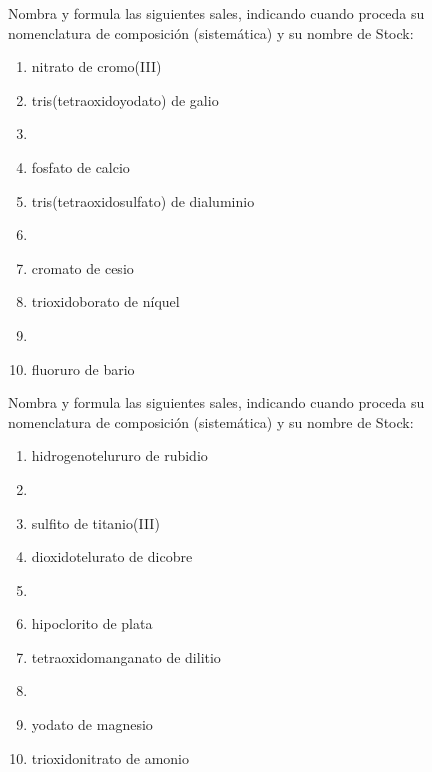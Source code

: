 \documentclass[10pt]{article}
\begin{document}
\begin{exercise}[
    tags    = {inorgánica,sales, sales binarias,sales ternarias},
    topics  = {química inorgánica,formulación,nomenclatura},
    source  = {SAN Formulación, p29, e38},
  ]

  Nombra y formula las siguientes sales, indicando cuando proceda su nomenclatura de composición (sistemática) y su nombre de Stock:

  \begin{enumerate}
    \item nitrato de cromo(III)
    \item tris(tetraoxidoyodato) de galio
    \item {}
    \item fosfato de calcio
    \item tris(tetraoxidosulfato) de dialuminio
    \item {}
    \item cromato de cesio
    \item trioxidoborato de níquel
    \item {}
    \item fluoruro de bario
  \end{enumerate}
\end{exercise}


\begin{exercise}[
    tags    = {inorgánica,sales,sales binarias,sales ternarias},
    topics  = {química inorgánica,formulación,nomenclatura},
    source  = {SAN Formulación, p29, e39},
  ]

  Nombra y formula las siguientes sales, indicando cuando proceda su nomenclatura de composición (sistemática) y su nombre de Stock:

  \begin{enumerate}
    \item hidrogenotelururo de rubidio
    \item {}
    \item sulfito de titanio(III)
    \item dioxidotelurato de dicobre
    \item {}
    \item hipoclorito de plata
    \item tetraoxidomanganato de dilitio
    \item {}
    \item yodato de magnesio
    \item trioxidonitrato de amonio
  \end{enumerate}
\end{exercise}
\end{document}
